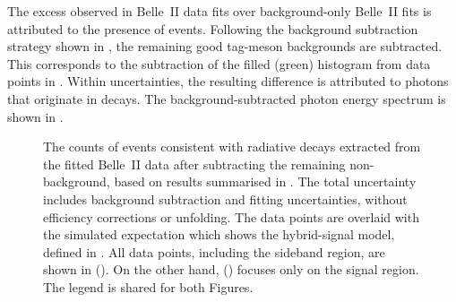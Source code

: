 The excess observed in Belle~II data fits over background-only Belle~II \MC fits is attributed to the presence of \BtoXsdgamma events.
Following the background subtraction strategy shown in ,
the remaining good tag-\B meson backgrounds are subtracted.
This corresponds to the subtraction of the filled (green) histogram from data points in .
Within uncertainties, the resulting difference is attributed to photons that originate in \BtoXsdgamma decays.
The background-subtracted photon energy spectrum is shown in .
\begin{figure}[hbtp!]
    \caption{\label{fig:subtracted_results}
        The counts of events consistent with radiative decays extracted from the fitted Belle~II data after subtracting the remaining non-\BtoXsdgamma background,
        based on results summarised in .
        The total uncertainty includes background subtraction and fitting uncertainties, without efficiency corrections or unfolding.
        The data points are overlaid with the simulated expectation which shows the hybrid-signal model, defined in .
        All data points, including the sideband region, are shown in ().
        On the other hand, () focuses only on the signal region.
        The legend is shared for both Figures.
    }
\end{figure}

